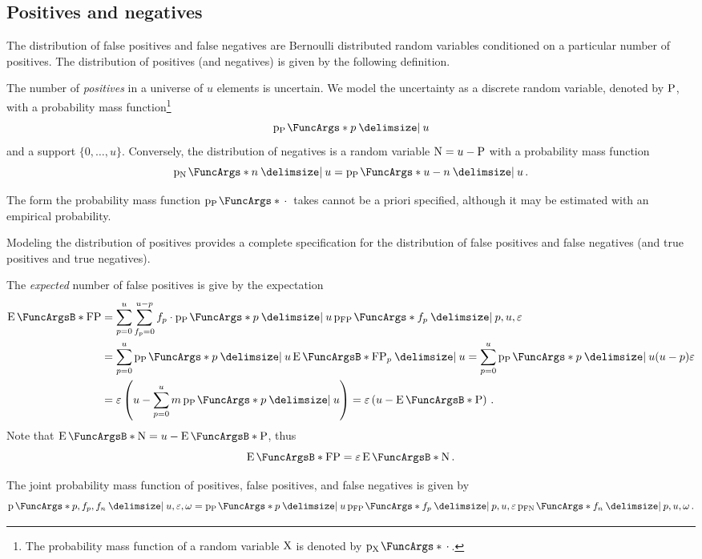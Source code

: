 \documentclass[ ../main.tex]{subfiles}
\begin{document}
\subsection{Positives and negatives}
The distribution of false positives and false negatives are Bernoulli distributed random variables conditioned on a particular number of positives. The distribution of positives (and negatives) is given by the following definition.
\begin{definition}
The number of \emph{positives} in a universe of $u$ elements is uncertain. We model the uncertainty as a discrete random variable, denoted by $\mathrm{P}$, with a probability mass function\footnote{The probability mass function of a random variable $\mathrm{X}$ is denoted by $\PDF{\,\cdot\,}[\RV{X}]$.}
\begin{equation}
    \PDF{p \Given u}[\RV{P}]
\end{equation}
and a support $\{0,\ldots,u\}$. Conversely, the distribution of negatives is a random variable $\mathrm{N} = u - \mathrm{P}$ with a probability mass function
\begin{equation}
    \PDF{n \Given u}[\RV{N}] = \PDF{u - n \Given u}[\RV{P}]\,.
\end{equation}
\end{definition}
The form the probability mass function $\PDF{\,\cdot\,}[\RV{P}]$ takes cannot be a priori specified, although it may be estimated with an empirical probability.

Modeling the distribution of positives provides a complete specification for the distribution of false positives and false negatives (and true positives and true negatives).
\begin{example}
The \emph{expected} number of false positives is give by the expectation
\begin{align}
    \Expect{\FP}
        &= \sum_{p=0}^{u} \sum_{f_p=0}^{u - p} f_p \cdot \PDF{p \Given u}[\RV{P}] \PDF{f_p \Given p, u, \fprate}[\FP]\\
        &= \sum_{p=0}^{u} \PDF{p \Given u}[\RV{P}] \Expect{\FP_p \Given u} = \sum_{p=0}^{u} \PDF{p \Given u}[\RV{P}](u-p) \fprate\\
        &= \fprate\left(u - \sum_{p=0}^{u} m \PDF{p \Given u}[\RV{P}]\right) = \fprate\left(u - \Expect{\RV{P}}\right)\,.
\end{align}
Note that $\Expect{\RV{N}} = u - \Expect{\RV{P}}$, thus
\begin{equation}
    \Expect{\FP} = \fprate \Expect{\RV{N}}\,.
\end{equation}
\end{example}

The joint probability mass function of positives, false positives, and false negatives is given by
\begin{equation}
    \PDF{p, f_p, f_n \Given u, \fprate, \fnrate} = \PDF{p \Given u}[\RV{P}] \PDF{f_p \Given p, u, \fprate}[\FP] \PDF{f_n \Given p, u, \fnrate}[\FN]\,.
\end{equation}
\end{document}
